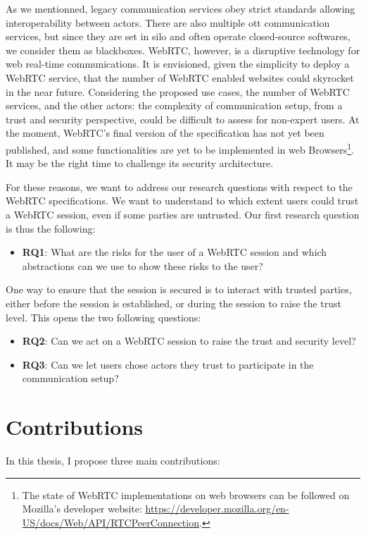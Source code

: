 As we mentionned, legacy communication services obey strict standards allowing interoperability between actors.
There are also multiple \gls{ott} communication services, but since they are set in silo and often operate closed-source softwares, we consider them as blackboxes.
WebRTC, however, is a disruptive technology for web real-time communications.
It is envisioned, given the simplicity to deploy a WebRTC service, that the number of WebRTC enabled websites could skyrocket in the near future.
Considering the proposed use cases, the number of WebRTC services, and the other actors: the complexity of communication setup, from a trust and security perspective, could be difficult to assess for non-expert users.
At the moment, WebRTC's final version of the specification has not yet been published, and some functionalities are yet to be implemented in web Browsers\footnote{The state of WebRTC implementations on web browsers can be followed on Mozilla's developer website: \url{https://developer.mozilla.org/en-US/docs/Web/API/RTCPeerConnection}.}.
It may be the right time to challenge its security architecture.

For these reasons, we want to address our research questions with respect to the WebRTC specifications.
We want to understand to which extent users could trust a WebRTC session, even if some parties are untrusted.
Our first research question is thus the following:

\begin{itemize}
\item \textbf{RQ1}: What are the risks for the user of a WebRTC session and which abstractions can we use to show these risks to the user?
\end{itemize}

One way to ensure that the session is secured is to interact with trusted parties, either before the session is established, or during the session to raise the trust level.
This opens the two following questions:
\begin{itemize}
\item \textbf{RQ2}: Can we act on a WebRTC session to raise the trust and security level? 
\item \textbf{RQ3}: Can we let users chose actors they trust to participate in the communication setup?
\end{itemize}

\section*{Contributions}
\label{introduction.contributions}
In this thesis, I propose three main contributions:

